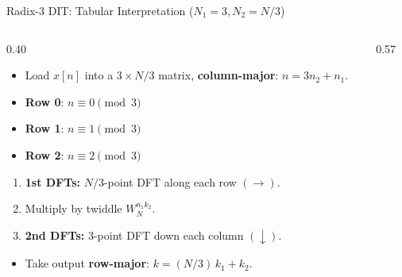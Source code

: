 \begin{frame}{Radix-3 DIT: Tabular Interpretation ($N_1=3, N_2=N/3$)}
    \begin{columns}[T]
        \begin{column}{0.40\textwidth}
            \begin{itemize}
                \item Load $x[n]$ into a $3 \times N/3$ matrix, \textbf{column-major}: $n = 3n_2 + n_1$.
                \item \textcolor{PrimaryColor}{\textbf{Row 0}}: $n \equiv 0 \pmod{3}$
                \item \textcolor{SecondaryColor}{\textbf{Row 1}}: $n \equiv 1 \pmod{3}$
                \item \textcolor{AccentColor}{\textbf{Row 2}}: $n \equiv 2 \pmod{3}$
            \end{itemize}
            \vspace{0.15cm}
            \begin{enumerate}
                \item \textbf{1st DFTs:} $N/3$-point DFT along each row $(\rightarrow)$.
                \item Multiply by twiddle $W_N^{n_1 k_2}$.
                \item \textbf{2nd DFTs:} 3-point DFT down each column $(\downarrow)$.
            \end{enumerate}
            \vspace{0.15cm}
            \begin{itemize}
                \item Take output \textbf{row-major}: $k = (N/3)\,k_1 + k_2$.
            \end{itemize}
        \end{column}
        \begin{column}{0.57\textwidth}
            \centering
            \vspace{0.1cm}
\end{column}
\end{columns}
\end{frame}

